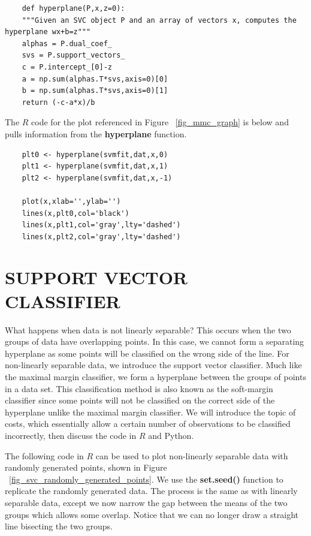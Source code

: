 \documentclass[12pt]{article}
\begin{document}
\begin{verbatim}
    def hyperplane(P,x,z=0):
    """Given an SVC object P and an array of vectors x, computes the hyperplane wx+b=z"""
    alphas = P.dual_coef_
    svs = P.support_vectors_
    c = P.intercept_[0]-z
    a = np.sum(alphas.T*svs,axis=0)[0]
    b = np.sum(alphas.T*svs,axis=0)[1]
    return (-c-a*x)/b
\end{verbatim}

The $R$ code for the plot referenced in Figure ~\ref{fig_mmc_graph} is below and pulls information from the \textbf{hyperplane} function.

\begin{verbatim}
    plt0 <- hyperplane(svmfit,dat,x,0)
    plt1 <- hyperplane(svmfit,dat,x,1)
    plt2 <- hyperplane(svmfit,dat,x,-1)
    
    plot(x,xlab='',ylab='')
    lines(x,plt0,col='black')
    lines(x,plt1,col='gray',lty='dashed')
    lines(x,plt2,col='gray',lty='dashed')
\end{verbatim}

\section{SUPPORT VECTOR CLASSIFIER}

What happens when data is not linearly separable? This occurs when the two groups of data have overlapping points. In this case, we cannot form a separating hyperplane as some points will be classified on the wrong side of the line. For non-linearly separable data, we introduce the support vector classifier. Much like the maximal margin classifier, we form a hyperplane between the groups of points in a data set. This classification method is also known as the soft-margin classifier since some points will not be classified on the correct side of the hyperplane unlike the maximal margin classifier. We will introduce the topic of costs, which essentially allow a certain number of observations to be classified incorrectly, then discuss the code in $R$ and Python.

The following code in $R$ can be used to plot non-linearly separable data with randomly generated points, shown in Figure ~\ref{fig_svc_randomly_generated_points}. We use the \textbf{set.seed()} function to replicate the randomly generated data. The process is the same as with linearly separable data, except we now narrow the gap between the means of the two groups which allows some overlap. Notice that we can no longer draw a straight line bisecting the two groups.
\end{document}
